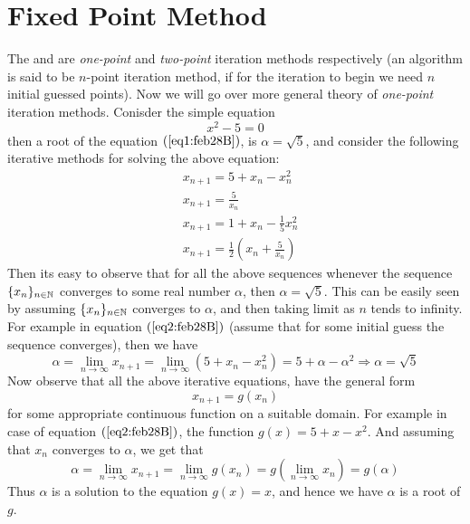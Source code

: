 
\section{Fixed Point Method}

The  and  are \textit{one-point} and \textit{two-point} iteration methods respectively (an algorithm is said to be $n$-point iteration method, if for the iteration to begin we need $n$ initial guessed points). Now we will go over more general theory of \textit{one-point} iteration methods. Conisder the simple equation 
\begin{equation}\label{eq1:feb28B}
    x^2 - 5 = 0
\end{equation}
then a root of the equation $(\ref{eq1:feb28B})$, is $\alpha = \sqrt{5}$, and consider the following iterative methods for solving the above equation: 
\begin{align}\label{eq2:feb28B}
    &x_{n+1} = 5 + x_n - x_n^2 \\ 
    &x_{n+1} = \frac{5}{x_n} \\ 
    &x_{n+1} = 1 + x_n - \frac{1}{5}x_n^2 \\    
    &x_{n+1} = \frac{1}{2}\left(x_n + \frac{5}{x_n}\right)  
\end{align}
Then its easy to observe that for all the above sequences whenever the sequence $\{x_n\}_{n\in\mathbb{N}}$ converges to some real number $\alpha$, then $\alpha = \sqrt{5}$. This can be easily seen by assuming $\{x_n\}_{n \in \mathbb{N}}$ converges to $\alpha$, and then taking limit as $n$ tends to infinity. For example in equation $(\ref{eq2:feb28B})$ (assume that for some initial guess the sequence converges), then we have 
\[
   \alpha = \lim_{n\to\infty} x_{n+1} = \lim_{n\to\infty} \left( 5+x_n-x_n^2 \right) = 5 + \alpha - \alpha^2 \Rightarrow \alpha = \sqrt{5}  
\] 
Now observe that all the above iterative equations, have the general form 
\begin{equation}\label{eq3:feb28B}
    x_{n+1} = g(x_n)
\end{equation}
for some appropriate continuous function on a suitable domain. For example in case of equation $(\ref{eq2:feb28B})$, the function $g(x) = 5+x-x^2$. And assuming that $x_n$ converges to $\alpha$, we get that 
\[
    \alpha = \lim_{n\to\infty} x_{n+1} = \lim_{n\to\infty} g(x_n) = g \left( \lim_{n\to\infty} x_n \right) = g(\alpha)  
\]
Thus $\alpha$ is a solution to the equation $g(x)=x$, and hence we have $\alpha$ is a root of $g$.

